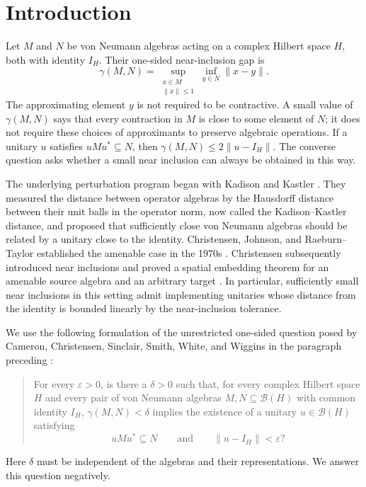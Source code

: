 \section{Introduction}\label{sec:introduction}

Let $M$ and $N$ be von Neumann algebras acting on a complex Hilbert
space $H$, both with identity $I_H$.  Their one-sided near-inclusion gap is
\begin{equation}\label{eq:gamma-definition}
 \gamma(M,N)=\sup_{\substack{x\in M\\\|x\|\leq 1}}
                   \inf_{y\in N}\|x-y\|.
\end{equation}
The approximating element $y$ is not required to be contractive.  A small
value of $\gamma(M,N)$ says that every contraction in $M$ is close to some
element of $N$; it does not require these choices of approximants to
preserve algebraic operations.  If a unitary $u$ satisfies $uMu^*\subseteq N$,
then $\gamma(M,N)\leq 2\|u-I_H\|$.  The converse question asks whether a
small near inclusion can always be obtained in this way.

The underlying perturbation program began with Kadison and Kastler
\cite{KK1972}.  They measured the distance between operator algebras by
the Hausdorff distance between their unit balls in the operator norm,
now called the Kadison--Kastler distance, and proposed that sufficiently
close von Neumann algebras should be related by a unitary close to the
identity.  Christensen, Johnson, and Raeburn--Taylor established the
amenable case in the 1970s
\cite{Chr1977,Joh1977,RT1977}.  Christensen subsequently introduced
near inclusions and proved a spatial embedding theorem for an amenable
source algebra and an arbitrary target
\cite[Definition~2.1 and Theorem~4.3]{Chr1980}.  In particular, sufficiently
small near inclusions in this setting admit implementing unitaries whose
distance from the identity is bounded linearly by the near-inclusion
tolerance.

We use the following formulation of the unrestricted one-sided question
posed by Cameron, Christensen, Sinclair, Smith, White, and Wiggins in
the paragraph preceding \cite[Theorem~2]{CCSSWW2012}:
\begin{quote}
For every $\varepsilon>0$, is there a $\delta>0$ such that, for every
complex Hilbert space $H$ and every pair of von Neumann algebras
$M,N\subseteq\mathcal B(H)$ with common identity $I_H$,
$\gamma(M,N)<\delta$ implies the existence of a unitary
$u\in\mathcal B(H)$ satisfying
\[
 uMu^*\subseteq N
 \qquad\text{and}\qquad
 \|u-I_H\|<\varepsilon?
\]
\end{quote}
Here $\delta$ must be independent of the algebras and their
representations.  We answer this question negatively.

